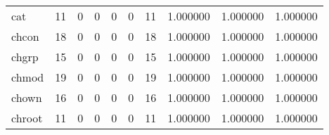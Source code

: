 \begin{longtable}{lrrrrrrrrr}
cat       &                                      11 &                                                  0 &                                                  0 &                                                  0 &                                                  0 &                                                 11 &                                           1.000000 &                               1.000000 &                             1.000000 \\
chcon     &                                      18 &                                                  0 &                                                  0 &                                                  0 &                                                  0 &                                                 18 &                                           1.000000 &                               1.000000 &                             1.000000 \\
chgrp     &                                      15 &                                                  0 &                                                  0 &                                                  0 &                                                  0 &                                                 15 &                                           1.000000 &                               1.000000 &                             1.000000 \\
chmod     &                                      19 &                                                  0 &                                                  0 &                                                  0 &                                                  0 &                                                 19 &                                           1.000000 &                               1.000000 &                             1.000000 \\
chown     &                                      16 &                                                  0 &                                                  0 &                                                  0 &                                                  0 &                                                 16 &                                           1.000000 &                               1.000000 &                             1.000000 \\
chroot    &                                      11 &                                                  0 &                                                  0 &                                                  0 &                                                  0 &                                                 11 &                                           1.000000 &                               1.000000 &                             1.000000 \\

\end{longtable}
